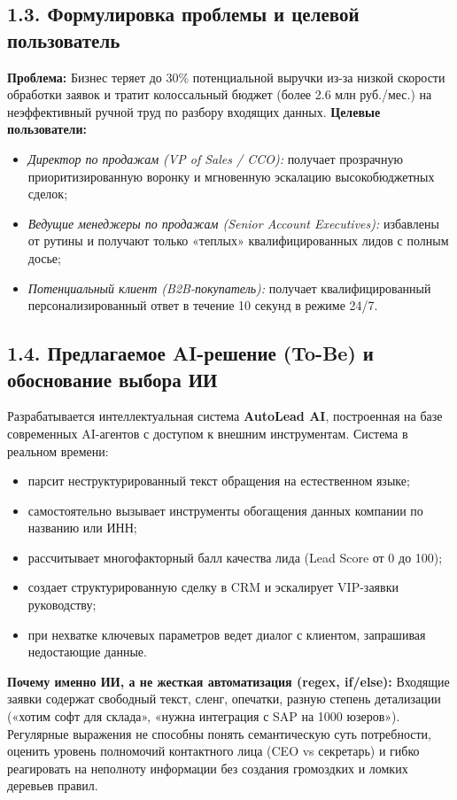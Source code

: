 \documentclass[12pt,a4paper]{article}
\begin{document}
	\subsection*{1.3. Формулировка проблемы и целевой пользователь}
	\textbf{Проблема:} Бизнес теряет до 30\% потенциальной выручки из-за низкой скорости обработки заявок и тратит колоссальный бюджет (более 2.6 млн руб./мес.) на неэффективный ручной труд по разбору входящих данных.
	\textbf{Целевые пользователи:}
	\begin{itemize}[noitemsep,topsep=1pt]
		\item \textit{Директор по продажам (VP of Sales / CCO):} получает прозрачную приоритизированную воронку и мгновенную эскалацию высокобюджетных сделок;
		\item \textit{Ведущие менеджеры по продажам (Senior Account Executives):} избавлены от рутины и получают только «теплых» квалифицированных лидов с полным досье;
		\item \textit{Потенциальный клиент (B2B-покупатель):} получает квалифицированный персонализированный ответ в течение 10 секунд в режиме 24/7.
	\end{itemize}

	\subsection*{1.4. Предлагаемое AI-решение (To-Be) и обоснование выбора ИИ}
	Разрабатывается интеллектуальная система \textbf{\guillemotleft AutoLead AI\guillemotright}, построенная на базе современных AI-агентов с доступом к внешним инструментам. Система в реальном времени:
	\begin{itemize}[noitemsep,topsep=1pt]
		\item парсит неструктурированный текст обращения на естественном языке;
		\item самостоятельно вызывает инструменты обогащения данных компании по названию или ИНН;
		\item рассчитывает многофакторный балл качества лида (Lead Score от 0 до 100);
		\item создает структурированную сделку в CRM и эскалирует VIP-заявки руководству;
		\item при нехватке ключевых параметров ведет диалог с клиентом, запрашивая недостающие данные.
	\end{itemize}
	\textbf{Почему именно ИИ, а не жесткая автоматизация (regex, if/else):} Входящие заявки содержат свободный текст, сленг, опечатки, разную степень детализации («хотим софт для склада», «нужна интеграция с SAP на 1000 юзеров»). Регулярные выражения не способны понять семантическую суть потребности, оценить уровень полномочий контактного лица (CEO vs секретарь) и гибко реагировать на неполноту информации без создания громоздких и ломких деревьев правил.
\end{document}
